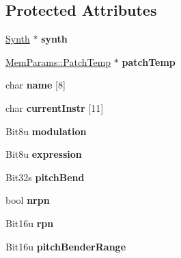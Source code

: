 \subsection*{Protected Attributes}
\begin{DoxyCompactItemize}
\item 
\hypertarget{classMT32Emu_1_1Part_a3a600e264002307fb276d6768ad1257b}{\hyperlink{classMT32Emu_1_1Synth}{Synth} $\ast$ {\bfseries synth}}\label{classMT32Emu_1_1Part_a3a600e264002307fb276d6768ad1257b}

\item 
\hypertarget{classMT32Emu_1_1Part_a1b0f60646c63d3b11efc23c81cb51326}{\hyperlink{structMT32Emu_1_1MemParams_1_1PatchTemp}{Mem\-Params\-::\-Patch\-Temp} $\ast$ {\bfseries patch\-Temp}}\label{classMT32Emu_1_1Part_a1b0f60646c63d3b11efc23c81cb51326}

\item 
\hypertarget{classMT32Emu_1_1Part_abd5c73cdc70d79c2bc26b7f8ef9715e7}{char {\bfseries name} \mbox{[}8\mbox{]}}\label{classMT32Emu_1_1Part_abd5c73cdc70d79c2bc26b7f8ef9715e7}

\item 
\hypertarget{classMT32Emu_1_1Part_a6a197f4bc47088aa0835ef7b961ebcab}{char {\bfseries current\-Instr} \mbox{[}11\mbox{]}}\label{classMT32Emu_1_1Part_a6a197f4bc47088aa0835ef7b961ebcab}

\item 
\hypertarget{classMT32Emu_1_1Part_aaaf239c80508ac942712d2f895680218}{Bit8u {\bfseries modulation}}\label{classMT32Emu_1_1Part_aaaf239c80508ac942712d2f895680218}

\item 
\hypertarget{classMT32Emu_1_1Part_a625dfcb287d63b6ba1f34b24c49f8dad}{Bit8u {\bfseries expression}}\label{classMT32Emu_1_1Part_a625dfcb287d63b6ba1f34b24c49f8dad}

\item 
\hypertarget{classMT32Emu_1_1Part_ac5f853de11e459665cc718836a59b0a0}{Bit32s {\bfseries pitch\-Bend}}\label{classMT32Emu_1_1Part_ac5f853de11e459665cc718836a59b0a0}

\item 
\hypertarget{classMT32Emu_1_1Part_aced93ff98f0883f7d694768a3ad7e201}{bool {\bfseries nrpn}}\label{classMT32Emu_1_1Part_aced93ff98f0883f7d694768a3ad7e201}

\item 
\hypertarget{classMT32Emu_1_1Part_a2891292e0c8fc97d393d9d4bc94a82e6}{Bit16u {\bfseries rpn}}\label{classMT32Emu_1_1Part_a2891292e0c8fc97d393d9d4bc94a82e6}

\item 
\hypertarget{classMT32Emu_1_1Part_ac78d84acadf25b0482052ee07dbd6732}{Bit16u {\bfseries pitch\-Bender\-Range}}\label{classMT32Emu_1_1Part_ac78d84acadf25b0482052ee07dbd6732}

\end{DoxyCompactItemize}



